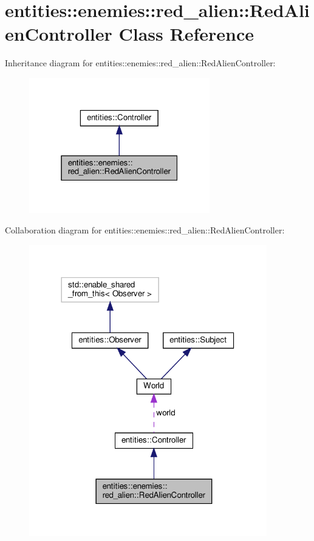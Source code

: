 \hypertarget{classentities_1_1enemies_1_1red__alien_1_1RedAlienController}{}\section{entities\+:\+:enemies\+:\+:red\+\_\+alien\+:\+:Red\+Alien\+Controller Class Reference}
\label{classentities_1_1enemies_1_1red__alien_1_1RedAlienController}


Inheritance diagram for entities\+:\+:enemies\+:\+:red\+\_\+alien\+:\+:Red\+Alien\+Controller\+:\nopagebreak
\begin{figure}[H]
\begin{center}
\leavevmode
\includegraphics[width=223pt]{classentities_1_1enemies_1_1red__alien_1_1RedAlienController__inherit__graph}
\end{center}
\end{figure}


Collaboration diagram for entities\+:\+:enemies\+:\+:red\+\_\+alien\+:\+:Red\+Alien\+Controller\+:\nopagebreak
\begin{figure}[H]
\begin{center}
\leavevmode
\includegraphics[width=293pt]{classentities_1_1enemies_1_1red__alien_1_1RedAlienController__coll__graph}
\end{center}
\end{figure}
